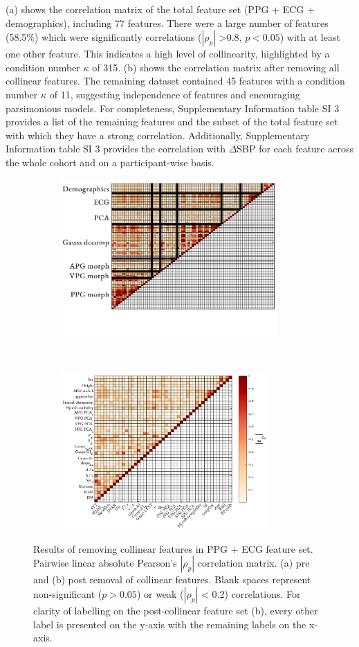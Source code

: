\documentclass[fleqn,10pt]{wlscirep}
\begin{document}
 (a) shows the correlation matrix of the total feature set (PPG + ECG + demographics), including 77 features. There were a large number of features (58.5\%) which were significantly correlations ($|\rho_p|$ >0.8, $p < 0.05$) with at least one other feature. This indicates a high level of collinearity, highlighted by a condition number $\kappa$ of 315.  (b) shows the correlation matrix after removing all collinear features. The remaining dataset contained 45 features with a condition number $\kappa$ of 11, suggesting independence of features and encouraging parsimonious models. For completeness, Supplementary Information table SI 3 provides a list of the remaining features and the subset of the total feature set with which they have a strong correlation. Additionally, Supplementary Information table SI 3 provides the correlation with $\Delta$SBP for each feature across the whole cohort and on a participant-wise basis. 

\begin{figure}[ht]
	\centering
	\begin{subfigure}{.49\textwidth}
		\centering
		\includegraphics[height = 6cm]{before_collinear.png}
		\caption{}
	\end{subfigure}
	~
	\begin{subfigure}{.49\textwidth}
		\centering
		\includegraphics[height = 6cm]{after_collinear.png}
		\caption{}
	\end{subfigure}
	\caption{Results of removing collinear features in PPG + ECG feature set. Pairwise linear absolute Pearson's $|\rho_p|$ correlation matrix. (a) pre and (b) post removal of collinear features. Blank spaces represent non-significant ($p > 0.05$) or weak ($|\rho_p|$ < 0.2) correlations. For clarity of labelling on the post-collinear feature set (b), every other label is presented on the y-axis with the remaining labels on the x-axis. }
	\label{fig:collinear_features}
\end{figure}
\end{document}
